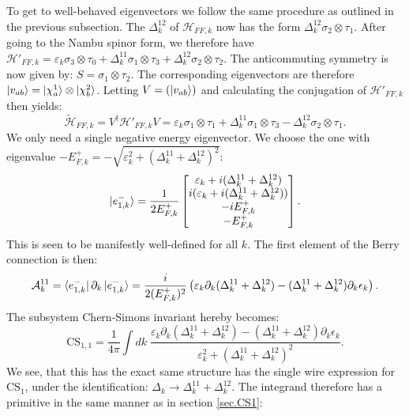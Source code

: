 To get to well-behaved eigenvectors we follow the same procedure as outlined in the previous subsection. The $\Delta^{12}_k$ of $\mathcal{H}_{FF,k}$ now has the form $\Delta^{12}_k \sigma_2 \otimes \tau_1$. After going to the Nambu spinor form, we therefore have $\mathcal{H}'_{FF,k} = \varepsilon_k \sigma_3 \otimes \tau_0 + \Delta^{11}_k \sigma_1 \otimes \tau_3 + \Delta^{12}_k \sigma_2 \otimes \tau_2$. The anticommuting symmetry is now given by: $S = \sigma_1\otimes \tau_2$. The corresponding eigenvectors are therefore $\ket{v_{ab}} = \ket{\chi^{1}_a}\otimes\ket{\chi^{2}_b}$. Letting $V = (\ket{v_{ab}})$ and calculating the conjugation of $\mathcal{H}'_{FF,k}$ then yields:
\begin{equation}
\tilde{\mathcal{H}}_{FF,k} = V^\dagger\mathcal{H}'_{FF,k}V = \varepsilon_k \sigma_1\otimes \tau_1 + \Delta^{11}_k \sigma_1\otimes\tau_3 - \Delta^{12}_k\sigma_2\otimes\tau_1. \nonumber 
\end{equation}
We only need a single negative energy eigenvector. We choose the one with eigenvalue $-E^+_{F,k} = -\sqrt{\varepsilon_k^2 + (\Delta^{11}_k + \Delta^{12}_k)^2}$: 
\begin{equation}
\ket{e^{-}_{1,k}} = \frac{1}{2E^{+}_{F,k}}\begin{bmatrix} \varepsilon_k + i(\Delta^{11}_k + \Delta^{12}_k) \\ i(\varepsilon_k + i(\Delta^{11}_k + \Delta^{12}_k)) \\ -iE^{+}_{F,k} \\ -E^{+}_{F,k} \end{bmatrix}. \nonumber
\end{equation}
This is seen to be manifestly well-defined for all $k$. The first element of the Berry connection is then:
\begin{equation}
\mathcal{A}^{11}_k = \bra{e^{-}_{1,k}}\partial_k\ket{e^{-}_{1,k}} = \frac{i}{2(E^{+}_{F,k})^2}\left(\varepsilon_k\partial_k(\Delta^{11}_k + \Delta^{12}_k) - (\Delta^{11}_k + \Delta^{12}_k)\partial_k \epsilon_k\right). \nonumber
\end{equation}
The subsystem Chern-Simons invariant hereby becomes: 
\begin{equation}
\text{CS}_{1,1} = \frac{1}{4\pi}\int dk \; \frac{\varepsilon_k\partial_k(\Delta^{11}_k + \Delta^{12}_k) - (\Delta^{11}_k + \Delta^{12}_k)\partial_k \epsilon_k}{\varepsilon_k^2 + (\Delta^{11}_k + \Delta^{12}_k)^2}. 
\label{eq.CS11integralform}
\end{equation}
We see, that this has the exact same structure has the single wire expression for $\text{CS}_{1}$, under the identification: $\Delta_k \to \Delta^{11}_k + \Delta^{12}_k$. The integrand therefore has a primitive in the same manner as in section \ref{sec.CS1}:
